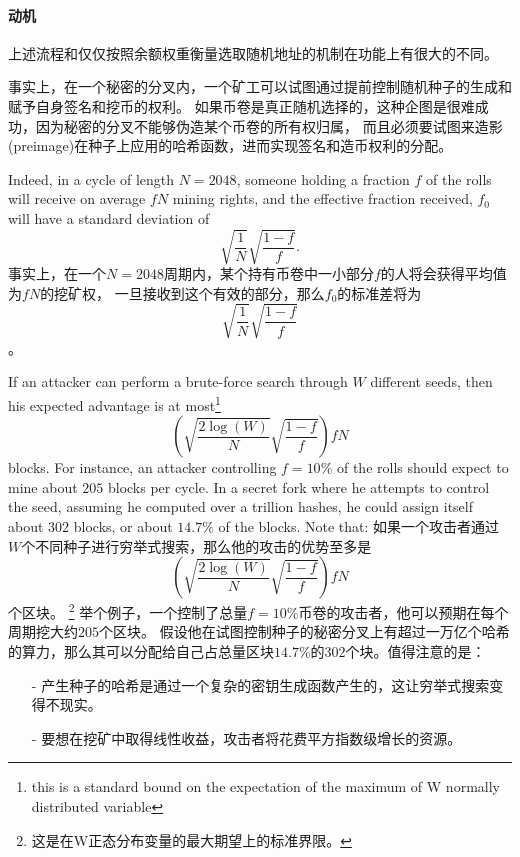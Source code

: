 \documentclass[letterpaper]{article}
\begin{document}
\paragraph{动机}
上述流程和仅仅按照余额权重衡量选取随机地址的机制在功能上有很大的不同。

事实上，在一个秘密的分叉内，一个矿工可以试图通过提前控制随机种子的生成和赋予自身签名和挖币的权利。
如果币卷是真正随机选择的，这种企图是很难成功，因为秘密的分叉不能够伪造某个币卷的所有权归属，
而且必须要试图来造影 (preimage)在种子上应用的哈希函数，进而实现签名和造币权利的分配。

Indeed, in a cycle of length $N=\num{2048}$, someone holding a fraction $f$ of
the rolls will receive on average $f N$ mining rights, and the effective
fraction received, $f_0$ will have a standard deviation of
$$\sqrt{\frac{1}{N}}\sqrt{\frac{1-f}{f}}.$$
事实上，在一个$N=\num{2048}$周期内，某个持有币卷中一小部分$f$的人将会获得平均值为$f N$的挖矿权，
一旦接收到这个有效的部分，那么$f_0$的标准差将为$$\sqrt{\frac{1}{N}}\sqrt{\frac{1-f}{f}}$$。

If an attacker can perform a brute-force search through $W$ different seeds,
then his expected advantage is at most\footnote{this is a standard bound
on the expectation of the maximum of W normally distributed variable}
$$\left(\sqrt{\frac{2\log(W)}{N}}\sqrt{\frac{1-f}{f}}\right)fN$$
blocks. For instance, an attacker controlling $f = 10\%$ of the rolls should
expect  to mine about $205$ blocks per cycle. In a secret fork where he attempts
to control the seed, assuming he computed over a trillion hashes, he could
assign itself about $302$ blocks, or about $14.7\%$ of the blocks. Note that:
如果一个攻击者通过$W$个不同种子进行穷举式搜索，那么他的攻击的优势至多是$$\left(\sqrt{\frac{2\log(W)}{N}}\sqrt{\frac{1-f}{f}}\right)fN$$个区块。
\footnote{这是在W正态分布变量的最大期望上的标准界限。}
举个例子，一个控制了总量$f = 10\%$币卷的攻击者，他可以预期在每个周期挖大约$205$个区块。
假设他在试图控制种子的秘密分叉上有超过一万亿个哈希的算力，那么其可以分配给自己占总量区块$14.7\%$的$302$个块。值得注意的是：
\begin{itemize}
\item[-] %
产生种子的哈希是通过一个复杂的密钥生成函数产生的，这让穷举式搜索变得不现实。
\item[-] %
要想在挖矿中取得线性收益，攻击者将花费平方指数级增长的资源。
\end{itemize}  
\end{document}
